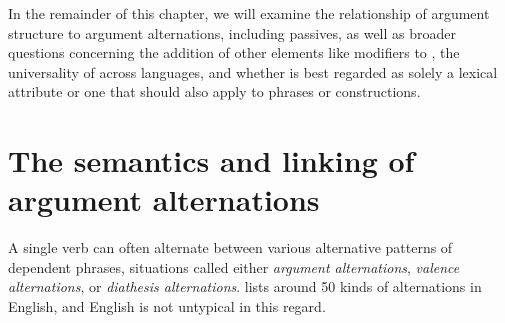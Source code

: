 \documentclass[output=paper
                ,modfonts
                ,nonflat
	        ,collection
	        ,collectionchapter
	        ,collectiontoclongg
 	        ,biblatex
                ,babelshorthands
                ,newtxmath
                ,draftmode
                ,colorlinks, citecolor=brown
]{./langsci/langscibook}
\begin{document}
In the remainder of this chapter, we will examine the relationship of argument structure to argument alternations, including passives, as well as broader questions concerning the addition of other elements like modifiers to \argst, the universality of \argst across languages, and whether \argst is best regarded as solely a lexical attribute or one that should also apply to phrases or constructions.


\section{The semantics and linking of argument alternations}
\label{alternations}
A single verb can often alternate between
 various alternative patterns of dependent phrases, situations called either 
\emph{argument alternations},
\emph{valence alternations}, or \emph{diathesis alternations}.
\citet{Levin1993} lists around 50 kinds of alternations in English, and English is not untypical in this regard.

%
\end{document}
